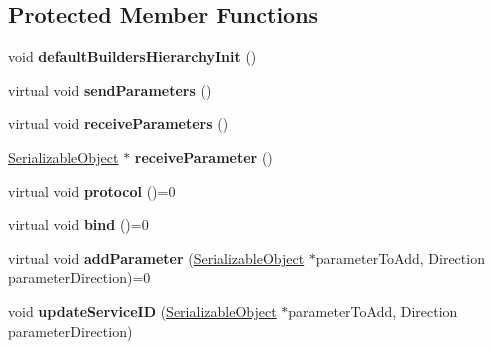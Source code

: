 \subsection*{Protected Member Functions}
\begin{DoxyCompactItemize}
\item 
\hypertarget{class_service_ae9faaf32f96dc52652c4bf9bcf9536bf}{
void {\bfseries defaultBuildersHierarchyInit} ()}
\label{class_service_ae9faaf32f96dc52652c4bf9bcf9536bf}

\item 
\hypertarget{class_service_a8f597fc46efa39db8e88b4c00b5ae28e}{
virtual void {\bfseries sendParameters} ()}
\label{class_service_a8f597fc46efa39db8e88b4c00b5ae28e}

\item 
\hypertarget{class_service_a94c5f15724d90f1bd9bf9583a9bcb4e0}{
virtual void {\bfseries receiveParameters} ()}
\label{class_service_a94c5f15724d90f1bd9bf9583a9bcb4e0}

\item 
\hypertarget{class_service_a53fd30ed541d06e2074713e1cc2618a0}{
\hyperlink{class_serializable_object}{SerializableObject} $\ast$ {\bfseries receiveParameter} ()}
\label{class_service_a53fd30ed541d06e2074713e1cc2618a0}

\item 
\hypertarget{class_service_a299cd6f9121b107e20714481a5de52b6}{
virtual void {\bfseries protocol} ()=0}
\label{class_service_a299cd6f9121b107e20714481a5de52b6}

\item 
\hypertarget{class_service_a8192de240a537ca8fc95d4fc96621aa5}{
virtual void {\bfseries bind} ()=0}
\label{class_service_a8192de240a537ca8fc95d4fc96621aa5}

\item 
\hypertarget{class_service_aec55dfc9e93a7652f47bd8ace7e33b02}{
virtual void {\bfseries addParameter} (\hyperlink{class_serializable_object}{SerializableObject} $\ast$parameterToAdd, Direction parameterDirection)=0}
\label{class_service_aec55dfc9e93a7652f47bd8ace7e33b02}

\item 
\hypertarget{class_service_aa533d97fd7b54495cf644fb7fc06cdc2}{
void {\bfseries updateServiceID} (\hyperlink{class_serializable_object}{SerializableObject} $\ast$parameterToAdd, Direction parameterDirection)}
\label{class_service_aa533d97fd7b54495cf644fb7fc06cdc2}

\end{DoxyCompactItemize}
